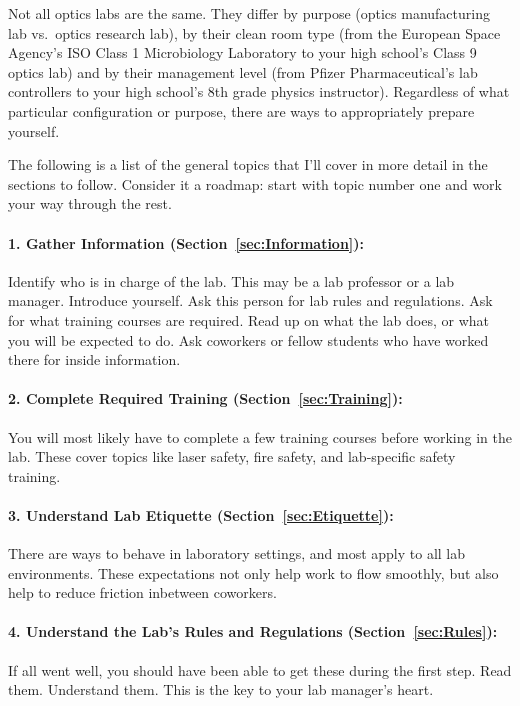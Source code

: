\documentclass[11pt]{article}
\begin{document}
Not all optics labs are the same. They differ by purpose (optics manufacturing lab vs.~optics research lab), by their clean room type (from the European Space Agency's ISO Class 1 Microbiology Laboratory to your high school's Class 9 optics lab) and by their management level (from Pfizer Pharmaceutical's lab controllers to your high school's 8th grade physics instructor). Regardless of what particular configuration or purpose, there are ways to appropriately prepare yourself.

The following is a list of the general topics that I'll cover in more detail in the sections to follow. Consider it a roadmap: start with topic number one and work your way through the rest.

\paragraph{1. Gather Information (Section~\ref{sec:Information}):} 
Identify who is in charge of the lab. This may be a lab professor or a lab manager. Introduce yourself. Ask this person for lab rules and regulations. Ask for what training courses are required. Read up on what the lab does, or what you will be expected to do. Ask coworkers or fellow students who have worked there for inside information. 

\vspace{-10pt}

\paragraph{2. Complete Required Training (Section~\ref{sec:Training}):}
You will most likely have to complete a few training courses before working in the lab. These cover topics like laser safety, fire safety, and lab-specific safety training. 

\vspace{-10pt}

\paragraph{3. Understand Lab Etiquette (Section~\ref{sec:Etiquette}):}
There are ways to behave in laboratory settings, and most apply to all lab environments. These expectations not only help work to flow smoothly, but also help to reduce friction inbetween coworkers.

\vspace{-10pt}

\paragraph{4. Understand the Lab's Rules and Regulations (Section~\ref{sec:Rules}):}
If all went well, you should have been able to get these during the first step. Read them. Understand them. This is the key to your lab manager's heart.
\end{document}
